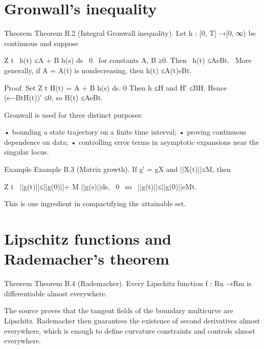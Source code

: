 \section{Gronwall’s inequality}

\begin{statementbox}{Theorem}
Theorem B.2 (Integral Gronwall inequality). Let h : [0, T] →[0, ∞) be continuous and suppose
\end{statementbox}

\begin{displaytext}
Z t \
h(t) ≤A + B h(s) ds \
0 \
for constants A, B ≥0. Then \
h(t) ≤AeBt. \
More generally, if A = A(t) is nondecreasing, then h(t) ≤A(t)eBt.
\end{displaytext}

\begin{prooftext}
Proof. Set Z t H(t) = A + B h(s) ds. 0 Then h ≤H and H′ ≤BH. Hence (e−BtH(t))′ ≤0, so H(t) ≤AeBt.
\end{prooftext}

Gronwall is used for three distinct purposes:


• bounding a state trajectory on a finite time interval; • proving continuous dependence on data; • controlling error terms in asymptotic expansions near the singular locus.


\begin{statementbox}{Example}
Example B.3 (Matrix growth). If g′ = gX and ||X(t)||≤M, then
\end{statementbox}

\begin{displaytext}
Z t \
||g(t)||≤||g(0)||+ M ||g(s)||ds, \
0 \
so \
||g(t)||≤||g(0)||eMt.
\end{displaytext}

This is one ingredient in compactifying the attainable set.


\section{Lipschitz functions and Rademacher’s theorem}

\begin{statementbox}{Theorem}
Theorem B.4 (Rademacher). Every Lipschitz function f : Rn →Rm is differentiable almost everywhere.
\end{statementbox}

The source proves that the tangent fields of the boundary multicurve are Lipschitz. Rademacher then guarantees the existence of second derivatives almost everywhere, which is enough to define curvature constraints and controls almost everywhere.


